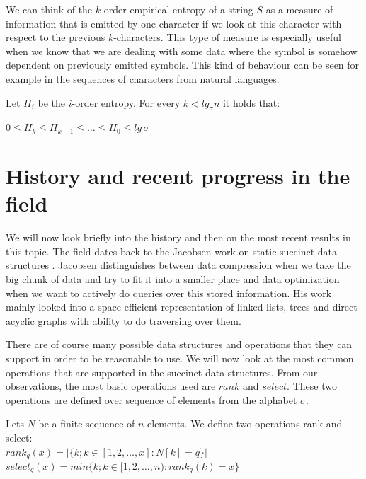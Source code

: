 We can think of the $k$-order empirical entropy of a string $S$ as a measure of information that is emitted by one character if we look at this character with respect to the previous $k$-characters. This type of measure is especially useful when we know that we are dealing with some data where the symbol is somehow dependent on previously emitted symbols. This kind of behaviour can be seen for example in the sequences of characters from natural languages.

\begin{theorem}
Let $H_i$ be the $i$-order entropy. For every $k<lg_{\sigma}n$ it holds that:
\begin{center}
$0\leq H_{k}\leq H_{k-1}\leq \ldots\leq H_0 \leq lg\, \sigma$
\end{center}
\end{theorem}

\section{History and recent progress in the field}

We will now look briefly into the history and then on the most recent results in this topic. The field dates back to the Jacobsen work on static succinct data structures \cite{jacobson1988succinct}. Jacobsen distinguishes between data compression when we take the big chunk of data and try to fit it into a smaller place and
data optimization when we want to actively do queries over this stored information. His work mainly looked into a space-efficient representation of linked lists, trees and direct-acyclic graphs with ability to do traversing over them.

There are of course many possible data structures and operations that they can support in order to be reasonable to use. We will now look at the most common operations that are supported in the succinct data structures. From our observations, the most basic operations used are $rank$ and $select$. These two operations are defined over sequence of elements from the alphabet $\sigma$.

\begin{theorem}
Lets $N$ be a finite sequence of $n$ elements.
We define two operations rank and select: \\
$rank_q(x) = | \{k; k \in [ 1, 2, \ldots, x] : N[k] = q  \} |$ \\
$select_q(x) = min \{k; k \in [ 1, 2, \ldots, n) : rank_q(k)=x  \} $
\end{theorem}


